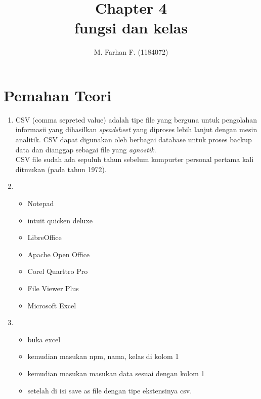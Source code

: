 \documentclass[12pt]{article}
\begin{document}
\title{Chapter 4 \\ fungsi dan kelas}
\author{M. Farhan F. (1184072)}
\date{}
\maketitle

\section{Pemahan Teori}

	\begin{enumerate}
		\item CSV (comma sepreted value) adalah tipe file yang berguna untuk pengolahan informasii yang dihasilkan \textit{speadsheet} yang diproses lebih lanjut dengan mesin analitik. CSV dapat digunakan oleh berbagai database untuk proses backup data dan dianggap sebagai file yang \textit{agnostik}.\\
		CSV file sudah ada sepuluh tahun sebelum kompurter personal pertama kali ditmukan (pada tahun 1972).\\
		
		
		\item 			
			\begin{itemize}
		\item Notepad
		\item intuit quicken deluxe
		\item LibreOffice
		\item Apache Open Office
		\item Corel Quarttro Pro
		\item File Viewer Plus
		\item Microsoft Excel
				
			\end{itemize}
		
		\item 
		\begin{itemize}
			\item buka excel
			\item kemudian masukan npm, nama, kelas di kolom 1
			\item kemudian masukan masukan data sesuai dengan kolom 1
			\item setelah di isi save as file dengan  tipe ekstensinya csv.
		\end{itemize}
		

\end{enumerate}
\end{document}
